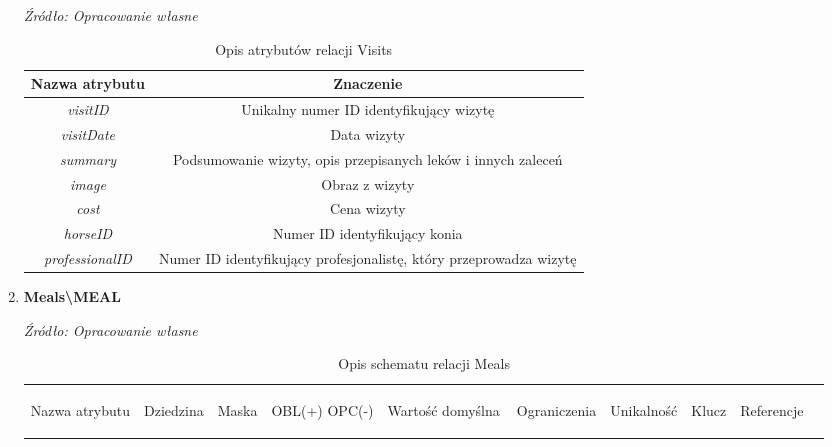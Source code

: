 \documentclass[12pt,twoside]{report}
\begin{document}
\begin{enumerate}[start=10,label={\bfseries REL\textbackslash\arabic*}]
	\begin{table}[H]
		\caption{Opis atrybutów relacji Visits}
		\textit{Źródło: Opracowanie własne}
		\label{VisitsAttributeDescription}
		\centering
		\begin{tabular}{|c|c|}
			\hline
			Nazwa atrybutu & Znaczenie \\
						\hline
			\textit{visitID}&Unikalny numer ID identyfikujący wizytę\\	
			\hline	
			\textit{visitDate}& Data wizyty\\	
			\hline	
			\textit{summary}& Podsumowanie wizyty, opis przepisanych leków i innych zaleceń\\	
			\hline	
			\textit{image}& Obraz z wizyty\\	
			\hline
			\textit{cost}&Cena wizyty\\	
			\hline			
			\textit{horseID}&Numer ID identyfikujący konia\\	
			\hline			
			\textit{professionalID}&Numer ID identyfikujący profesjonalistę, który przeprowadza wizytę\\	
			\hline
		\end{tabular}
	\end{table}
	\item \textbf{Meals\textbackslash MEAL} 
	\begin{table}[H]
		\caption{Opis schematu relacji Meals}
		\textit{Źródło: Opracowanie własne}
		\label{MealsRelationSchema}
		\centering
		\begin{tabular}{|c|c|c|c|c|c|c|c|c|c|}
			\hline
			\begin{sideways}Nazwa atrybutu\end{sideways}& 
			\begin{sideways}Dziedzina \end{sideways}& 
			\begin{sideways}Maska \end{sideways}& 
			\begin{sideways}OBL(+) OPC(-)\end{sideways} & 
			\begin{sideways}Wartość domyślna$\ $\end{sideways}& 
			\begin{sideways}Ograniczenia\end{sideways} &
			\begin{sideways}Unikalność \end{sideways}& 
			\begin{sideways}Klucz \end{sideways}& 
			\begin{sideways}Referencje \end{sideways}&

\end{tabular}
\end{table}
\end{enumerate}
\end{document}
